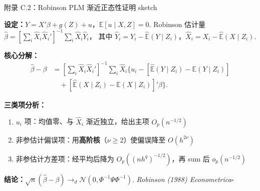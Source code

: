 \documentclass[aspectratio=169, 10pt]{beamer}
\begin{document}
\begin{frame}{附录 C.2：Robinson PLM 渐近正态性证明 sketch}
  \hypertarget{proof-c2}{}

  \textbf{设定：}$Y = X'\beta + g(Z) + u$，$\mathbb{E}[u\mid X, Z] = 0$.
  Robinson 估计量 $\hat\beta = [\sum_i \hat X_i \hat X_i']^{-1} \sum_i \hat X_i \hat Y_i$，
  其中 $\hat Y_i = Y_i - \hat{\mathbb{E}}(Y\mid Z_i)$，$\hat X_i = X_i - \hat{\mathbb{E}}(X\mid Z_i)$.

  \textbf{核心分解：}
  \begin{align*}
  \hat\beta - \beta &= \left[\sum_i \hat X_i \hat X_i'\right]^{-1}
  \sum_i \hat X_i \bigl\{u_i - [\hat{\mathbb{E}}(Y\mid Z_i) - \mathbb{E}(Y\mid Z_i)] \\
  &\quad + [\hat{\mathbb{E}}(X\mid Z_i) - \mathbb{E}(X\mid Z_i)]'\beta\bigr\}.
  \end{align*}

  \textbf{三类项分析：}
  \begin{enumerate}\setlength{\itemsep}{1pt}
    \item $u_i$ 项：均值零、与 $\hat X_i$ 渐近独立，给出主项 $O_p(n^{-1/2})$
    \item 非参估计偏误项：用\textbf{高阶核}（$\nu \geq 2$）使偏误降至 $O(h^{2\nu})$
    \item 非参估计方差项：经平均后降为 $O_p((nh^q)^{-1/2})$，再 sum 后 $o_p(n^{-1/2})$
  \end{enumerate}

  \textbf{结论：}$\sqrt{n}(\hat\beta - \beta) \to_d \mathcal{N}(0, \Phi^{-1}\Psi\Phi^{-1})$.
  \hfill{\scriptsize\textit{Robinson (1988) Econometrica}}\quad$\square$
  \hfill{\scriptsize\hyperlink{main-c2}{}}

\end{frame}
\end{document}
